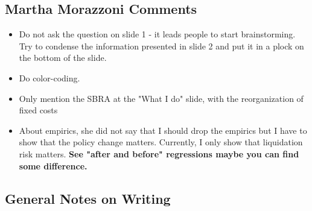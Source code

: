 \documentclass[12pt]{article}
\begin{document}
\subsection*{Martha Morazzoni Comments} 
\begin{itemize} \setlength\itemsep{0em}  \small
    \item Do not ask the question on slide 1 - it leads people to start brainstorming. Try to condense the information presented in slide 2 and put it in a plock on the bottom of the slide. 
    \item Do color-coding. 
    \item Only mention the SBRA at the "What I do" slide, with the reorganization of fixed costs
    \item About empirics, she did not say that I should drop the empirics but I have to show that the policy change matters. Currently, I only show that liquidation risk matters. \textbf{See "after and before" regressions maybe you can find some difference.}
\end{itemize}

\subsection*{General Notes on Writing} 
\end{document}
